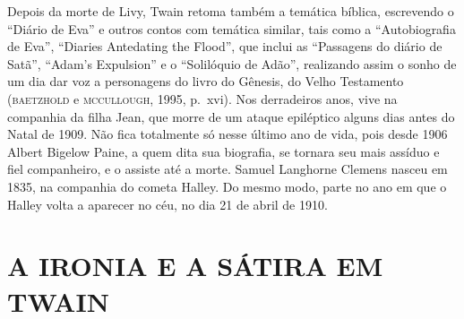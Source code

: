 Depois da morte de Livy, Twain retoma também a temática bíblica, escrevendo o
``Diário de Eva'' e outros contos com temática similar, tais como a
“Autobiografia de Eva”, “Diaries Antedating the Flood”, que inclui as
“Passagens do diário de Satã”, “Adam’s Expulsion” e o “Solilóquio de Adão”,
realizando assim o sonho de um dia dar voz a personagens do
livro do Gênesis, do Velho Testamento (\textsc{baetzhold} e \textsc{mccullough}, 1995, p.~xvi).
Nos derradeiros anos, vive na companhia da filha Jean, que morre de um ataque
epiléptico alguns dias antes do Natal de 1909. Não fica totalmente só
nesse último ano de vida, pois desde 1906 Albert Bigelow Paine, a quem
dita sua biografia, se tornara seu mais assíduo e fiel companheiro, e o
assiste até a morte. Samuel Langhorne Clemens nasceu em 1835, na companhia
do cometa Halley. Do mesmo modo, parte no ano em que o Halley volta a
aparecer no céu, no dia 21 de abril de 1910.


\section{A IRONIA E A SÁTIRA EM TWAIN}

